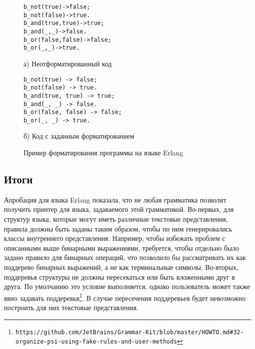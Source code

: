 \begin{figure}[h]
  \noindent
  \begin{minipage}{.45\textwidth}
    \begin{lstlisting}
b_not(true)->false;
b_not(false)->true.
b_and(true,true)->true;
b_and(_,_)->false.
b_or(false,false)->false;
b_or(_,_)->true.
    \end{lstlisting}
    \caption*{а) Неотформатированный код                }    
  \end{minipage}
  \hfill
  \begin{minipage}{.45\textwidth}
    \begin{lstlisting}
b_not(true) -> false; 
b_not(false) -> true.
b_and(true, true) -> true; 
b_and(_, _) -> false.
b_or(false, false) -> false;
b_or(_, _) -> true.
    \end{lstlisting}
    \caption*{б) Код с заданным форматированием}    
  \end{minipage}
  \caption{Пример форматирования программы на языке Erlang}
  \label{app:erlExRes1}
\end{figure}

\subsection{Итоги}
Апробация для языка Erlang показала, что не любая грамматика позволит получить принтер для языка, задаваемого этой грамматикой.
Во-первых, для структур языка, которые могут иметь различные текстовые представления, правила должны быть заданы таким образом, чтобы по ним генерировались классы внутреннего представления.
Например, чтобы избежать проблем с описанными выше бинарными выражениями, требуется, чтобы отдельно было задано правило для бинарных операций, что позволило бы рассматривать их как поддерево бинарных выражений, а не как терминальные символы.
Во-вторых, поддеревья структуры не должны пересекаться или быть вложенными друг в друга.
По умолчанию это условие выполняется, однако пользователь может также явно задавать поддеревья\footnote{\texttt{https://github.com/JetBrains/Grammar-Kit/blob/master/HOWTO.md\#32-organize-psi-using-fake-rules-and-user-methods}}.
В случае пересечения поддеревьев будет невозможно построить для них текстовые представления.


